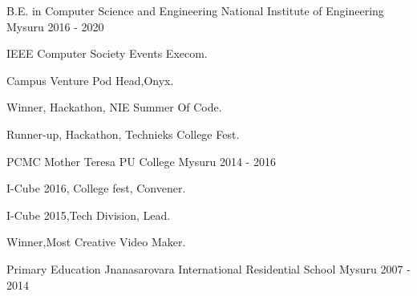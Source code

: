 

\begin{cventries}

  \cventry
    {B.E. in Computer Science and Engineering} %
    {National Institute of Engineering} %
    {Mysuru} %
    {2016 - 2020} %
    {
      \begin{cvitems} %
        \item {IEEE Computer Society Events Execom.}
        \item {Campus Venture Pod Head,Onyx.}
         \item {Winner, Hackathon, NIE Summer Of Code.}
          \item {Runner-up, Hackathon, Technieks College Fest.}
      \end{cvitems}
    }

  \cventry
    {PCMC} %
    {Mother Teresa PU College} %
    {Mysuru} %
    {2014 - 2016} %
    {
      \begin{cvitems} %
        \item {I-Cube 2016, College fest, Convener.}
        \item {I-Cube 2015,Tech Division, Lead.}
         \item {Winner,Most Creative Video Maker.}
      \end{cvitems}
    }

  \cventry
    {Primary Education} %
    {Jnanasarovara International Residential School} %
    {Mysuru} %
    {2007 - 2014} %
    {
    }

\end{cventries}
